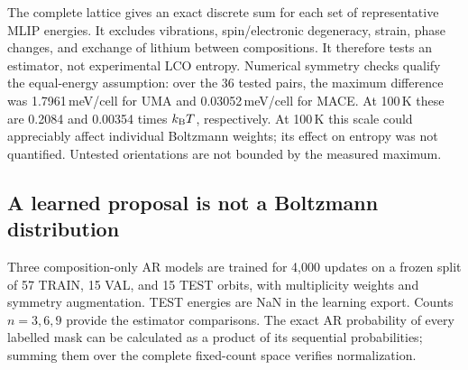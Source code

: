 \documentclass[11pt]{article}
\newcommand{\kb}{k_{\rm B}}
\begin{document}
The complete lattice gives an exact discrete sum for each set of
representative MLIP energies. It excludes vibrations, spin/electronic
degeneracy, strain, phase changes, and exchange of lithium between
compositions. It therefore tests an estimator, not experimental LCO entropy.
Numerical symmetry checks qualify the equal-energy assumption: over the 36
tested pairs, the maximum difference was 1.7961\,meV/cell for UMA and
0.03052\,meV/cell for MACE. At 100\,K these are 0.2084 and 0.00354 times
$\kb T$, respectively. At 100\,K this scale could appreciably affect
individual Boltzmann weights; its effect on entropy was not quantified.
Untested orientations are not bounded by the measured maximum.

\subsection{A learned proposal is not a Boltzmann distribution}
Three composition-only AR models are trained for 4,000 updates on a frozen
split of 57 TRAIN, 15 VAL, and 15 TEST orbits, with multiplicity weights and symmetry
augmentation. TEST energies are NaN in the learning export. Counts $n=3,6,9$
provide the estimator comparisons. The exact AR probability of every labelled
mask can be calculated as a product of its sequential probabilities; summing
them over the complete fixed-count space verifies normalization.
\end{document}

